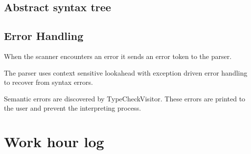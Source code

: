 \documentclass[12pt,a4paper]{article}
\begin{document}
\subsection{Abstract syntax tree}

\subsection{Error Handling}

When the scanner encounters an error it sends an error token to the parser.

The parser uses context sensitive lookahead with exception driven error handling
to recover from syntax errors.

Semantic errors are discovered by TypeCheckVisitor.
These errors are printed to the user and prevent the interpreting process.

\section{Work hour log}
\end{document}
